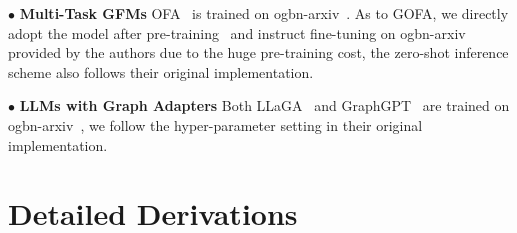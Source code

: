 $\bullet$ \textbf{Multi-Task GFMs} OFA~\cite{liu2023one} is trained on ogbn-arxiv~\cite{hu2020open}. As to GOFA, we directly adopt the model after pre-training~\cite{hu2021ogb, ding2023enhancing} and instruct fine-tuning on ogbn-arxiv~\cite{hu2020open} provided by the authors due to the huge pre-training cost, the zero-shot inference scheme also follows their original implementation.


$\bullet$ \textbf{LLMs with Graph Adapters} Both LLaGA~\cite{chen2024llaga} and GraphGPT~\cite{tang2024graphgpt} are trained on ogbn-arxiv~\cite{hu2020open}, we follow the hyper-parameter setting in their original implementation.


\section{Detailed Derivations}
\label{sec:app_detailed_derivation}


